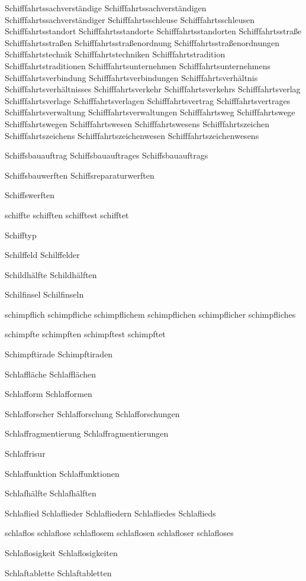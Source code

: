 Schifffahrtssachverständige
Schifffahrtssachverständigen
Schifffahrtssachverständiger
Schifffahrtsschleuse
Schifffahrtsschleusen
Schifffahrtsstandort
Schifffahrtsstandorte
Schifffahrtsstandorten
Schifffahrtsstraße
Schifffahrtsstraßen
Schifffahrtsstraßenordnung
Schifffahrtsstraßenordnungen
Schifffahrtstechnik
Schifffahrtstechniken
Schifffahrtstradition
Schifffahrtstraditionen
Schifffahrtsunternehmen
Schifffahrtsunternehmens
Schifffahrtsverbindung
Schifffahrtsverbindungen
Schifffahrtsverhältnis
Schifffahrtsverhältnisses
Schifffahrtsverkehr
Schifffahrtsverkehrs
Schifffahrtsverlag
Schifffahrtsverlage
Schifffahrtsverlagen
Schifffahrtsvertrag
Schifffahrtsvertrages
Schifffahrtsverwaltung
Schifffahrtsverwaltungen
Schifffahrtsweg
Schifffahrtswege
Schifffahrtswegen
Schifffahrtswesen
Schifffahrtswesens
Schifffahrtszeichen
Schifffahrtszeichens
Schifffahrtszeichenwesen
Schifffahrtszeichenwesens

Schiffsbauauftrag
Schiffsbauauftrages
Schiffsbauauftrags

Schiffsbauwerften
Schiffsreparaturwerften

Schiffswerften

schiffte
schifften
schifftest
schifftet

Schifftyp

Schilffeld 
Schilffelder

Schildhälfte
Schildhälften

Schilfinsel 
Schilfinseln

schimpflich
schimpfliche
schimpflichem
schimpflichen
schimpflicher
schimpfliches

schimpfte
schimpften
schimpftest
schimpftet

Schimpftirade
Schimpftiraden

Schlaffläche
Schlafflächen

Schlafform
Schlafformen

Schlafforscher
Schlafforschung
Schlafforschungen

Schlaffragmentierung
Schlaffragmentierungen

Schlaffrisur

Schlaffunktion
Schlaffunktionen

Schlafhälfte
Schlafhälften

Schlaflied 
Schlaflieder 
Schlafliedern 
Schlafliedes 
Schlaflieds

schlaflos 
schlaflose 
schlaflosem 
schlaflosen 
schlafloser 
schlafloses 

Schlaflosigkeit 
Schlaflosigkeiten

Schlaftablette
Schlaftabletten

